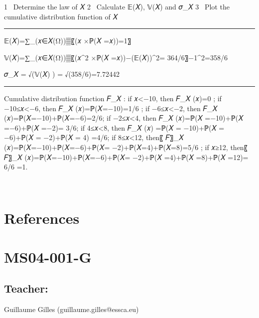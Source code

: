 \documentclass[
  letterpaper,
  DIV=11,
  numbers=noendperiod]{scrreprt}
\newlength{\cslhangindent}
\newenvironment{CSLReferences}[2] %
 {\begin{list}{}{%
  \setlength{\itemindent}{0pt}
  \setlength{\leftmargin}{0pt}
  \setlength{\parsep}{0pt}
  \ifodd #1
   \setlength{\leftmargin}{\cslhangindent}
   \setlength{\itemindent}{-1\cslhangindent}
  \fi
  \setlength{\itemsep}{#2\baselineskip}}}
 {\end{list}}
\begin{document}
1 ~Determine the law of 𝑋 2 ~Calculate 𝔼(𝑋), 𝕍(𝑋) and 𝜎\_𝑋 3 ~Plot the
cumulative distribution function of 𝑋

\begin{center}\rule{0.5\linewidth}{0.5pt}\end{center}

𝔼(𝑋)=∑\_(𝑥∈𝑋(Ω))▒〖(𝑥 ×ℙ(𝑋 =𝑥))=1〗

𝕍(𝑋)=∑\_(𝑥∈𝑋(Ω))▒〖(𝑥\^{}2 ×ℙ(𝑋 =𝑥))−(𝔼(𝑋))\^{}2= 364/6〗−1\^{}2=358/6

𝜎\_𝑋 = √(𝕍(𝑋) ) = √(358/6)=7.72442

\begin{center}\rule{0.5\linewidth}{0.5pt}\end{center}

Cumulative distribution function 𝐹\_𝑋 : if 𝑥\textless−10, then 𝐹\_𝑋
(𝑥)=0 ; if −10≤𝑥\textless−6, then 𝐹\_𝑋 (𝑥)=ℙ(𝑋=−10)=1/6 ; if
−6≤𝑥\textless−2, then 𝐹\_𝑋 (𝑥)=ℙ(𝑋=−10)+ℙ(𝑋=−6)=2/6; if −2≤𝑥\textless4,
then 𝐹\_𝑋 (𝑥)=ℙ(𝑋 =−10)+ℙ(𝑋 =−6)+ℙ(𝑋 =−2)= 3/6; if 4≤𝑥\textless8, then
𝐹\_𝑋 (𝑥) =ℙ(𝑋 = −10)+ℙ(𝑋 = −6)+ℙ(𝑋 = −2)+ℙ(𝑋 = 4) =4/6; if
8≤𝑥\textless12, then〖 𝐹〗\_𝑋 (𝑥)=ℙ(𝑋=−10)+ℙ(𝑋=−6)+ℙ(𝑋=
−2)+ℙ(𝑋=4)+ℙ(𝑋=8)=5/6 ; if 𝑥≥12, then〖 𝐹〗\_𝑋 (𝑥)=ℙ(𝑋=−10)+ℙ(𝑋=−6)+ℙ(𝑋=
−2)+ℙ(𝑋 =4)+ℙ(𝑋 =8)+ℙ(𝑋 =12)= 6/6 =1.

🏁🏁


\chapter*{References}\label{references}


\label{refs}
\begin{CSLReferences}{0}{1}
\end{CSLReferences}

\cleardoublepage
{}
{}
\appendix

\chapter{MS04-001-G}\label{ms04-001-g}

\section{Teacher:}\label{teacher}

Guillaume Gilles (guillaume.gilles@essca.eu)
\end{document}
